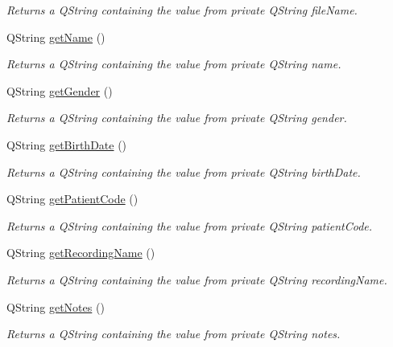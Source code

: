 \begin{DoxyCompactItemize}
\begin{DoxyCompactList}\small\item\em Returns a Q\+String containing the value from private Q\+String file\+Name. \end{DoxyCompactList}\item 
Q\+String \hyperlink{classSettingsSingleton_ab9e0ab27c53f748e458cfb14f71a94ea}{get\+Name} ()
\begin{DoxyCompactList}\small\item\em Returns a Q\+String containing the value from private Q\+String name. \end{DoxyCompactList}\item 
Q\+String \hyperlink{classSettingsSingleton_a3e61e7730d97ab3e893499538aba04ba}{get\+Gender} ()
\begin{DoxyCompactList}\small\item\em Returns a Q\+String containing the value from private Q\+String gender. \end{DoxyCompactList}\item 
Q\+String \hyperlink{classSettingsSingleton_a8e25762548883f476860ed5e1ab0b366}{get\+Birth\+Date} ()
\begin{DoxyCompactList}\small\item\em Returns a Q\+String containing the value from private Q\+String birth\+Date. \end{DoxyCompactList}\item 
Q\+String \hyperlink{classSettingsSingleton_a01b74f6d99cfbbd5bc6114b69ee5c87c}{get\+Patient\+Code} ()
\begin{DoxyCompactList}\small\item\em Returns a Q\+String containing the value from private Q\+String patient\+Code. \end{DoxyCompactList}\item 
Q\+String \hyperlink{classSettingsSingleton_a0275cd8a138fa91222ad36d9fbf465d2}{get\+Recording\+Name} ()
\begin{DoxyCompactList}\small\item\em Returns a Q\+String containing the value from private Q\+String recording\+Name. \end{DoxyCompactList}\item 
Q\+String \hyperlink{classSettingsSingleton_a14e8cddfa2bfbc896b9f31bddb4e675b}{get\+Notes} ()
\begin{DoxyCompactList}\small\item\em Returns a Q\+String containing the value from private Q\+String notes. \end{DoxyCompactList}\item 

\end{DoxyCompactItemize}
